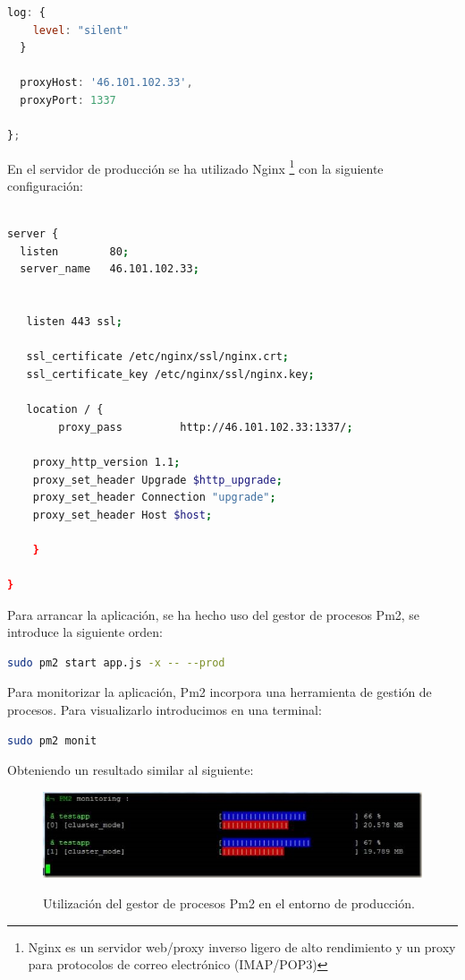 \begin{appendices}
\begin{lstlisting}[language=JavaScript]
  log: {
    level: "silent"
  }

  proxyHost: '46.101.102.33',
  proxyPort: 1337

};
\end{lstlisting}

En el servidor de producción se ha utilizado Nginx \footnote{Nginx es un servidor web/proxy inverso ligero de alto rendimiento y un proxy para protocolos de correo electrónico (IMAP/POP3)} 
con la siguiente configuración:\\

\begin{lstlisting}[language=bash]

server {
  listen        80;
  server_name   46.101.102.33;


   listen 443 ssl;

   ssl_certificate /etc/nginx/ssl/nginx.crt;
   ssl_certificate_key /etc/nginx/ssl/nginx.key;

   location / {
        proxy_pass         http://46.101.102.33:1337/;

	proxy_http_version 1.1;
	proxy_set_header Upgrade $http_upgrade;
	proxy_set_header Connection "upgrade";
	proxy_set_header Host $host;

    }

}

\end{lstlisting}

Para arrancar la aplicación, se ha hecho uso del gestor de procesos Pm2, se introduce la siguiente orden: \\

\begin{lstlisting}[language=bash]
  sudo pm2 start app.js -x -- --prod
\end{lstlisting}


Para monitorizar la aplicación, Pm2 incorpora una herramienta de gestión de procesos. Para visualizarlo introducimos en una terminal:\\

\begin{lstlisting}[language=bash]
  sudo pm2 monit
\end{lstlisting}


Obteniendo un resultado similar al siguiente:

\begin{figure}[H]
  \begin{center}
    \includegraphics[scale=0.8]{imagenes/pm2-monit.jpg}\\
    \caption{Utilización del gestor de procesos Pm2 en el entorno de producción.}
  \end{center}
\end{figure}



\end{appendices}





